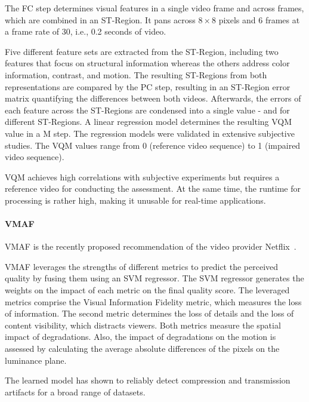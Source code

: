 The \acf{FC} step determines visual features in a single video frame and across frames, which are combined in an \acf{ST-Region}.
It pans across $8\times8$ pixels and $6$ frames at a frame rate of 30, i.e., 0.2 seconds of video.

Five different feature sets are extracted from the \ac{ST-Region}, including two features that focus on structural information 
whereas the others address color information,
contrast, 
and motion. 
The resulting \ac{ST-Region}s from both representations are compared by the \ac{PC} step, resulting in an \ac{ST-Region} error matrix quantifying the differences between both videos.
Afterwards, the errors of each feature across the \ac{ST-Region}s are condensed into a single value - and for different \ac{ST-Region}s. 
A linear regression model determines the resulting \ac{VQM} value in a \acf{M} step.
The regression models were validated in extensive subjective studies. 
The \ac{VQM} values range from $0$ (reference video sequence) to 1 (impaired video sequence).

\ac{VQM} achieves high correlations with subjective experiments but requires a reference video for conducting the assessment.
At the same time, the runtime for processing is rather high, making it unusable for real-time applications.
\paragraph{VMAF}
\ac{VMAF} is the recently proposed recommendation of the video provider Netflix~\cite{Li2016}.

\ac{VMAF} leverages the strengths of different metrics to predict the perceived quality by fusing them using an \ac{SVM} regressor.
The \ac{SVM} regressor generates the weights on the impact of each metric on the final quality score.
The leveraged metrics comprise the Visual Information Fidelity metric, which measures the loss of information.
The second metric determines the loss of details and the loss of content visibility, which distracts viewers.
Both metrics measure the spatial impact of degradations.
Also, the impact of degradations on the motion is assessed by calculating the average absolute differences of the pixels on the luminance plane.

The learned model has shown to reliably detect compression and transmission artifacts for a broad range of datasets.
